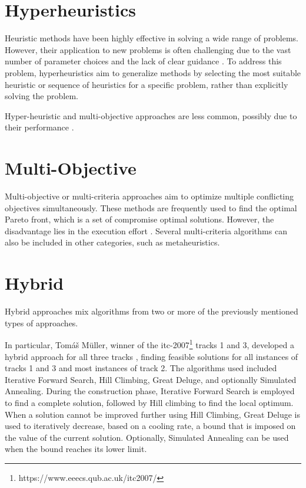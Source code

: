 
\section{Hyperheuristics}

Heuristic methods have been highly effective in solving a wide range of problems. However, their application to new problems is often challenging due to the vast number of parameter choices and the lack of clear guidance \cite{hyper_heuristics_survey}. To address this problem, hyperheuristics aim to generalize methods by selecting the most suitable heuristic or sequence of heuristics for a specific problem, rather than explicitly solving the problem.

Hyper-heuristic and multi-objective approaches are less common, possibly due to their performance \cite{chen_survey_2021}.

\section{Multi-Objective}

Multi-objective or multi-criteria approaches aim to optimize multiple conflicting objectives simultaneously. These methods are frequently used to find the optimal Pareto front, which is a set of compromise optimal solutions. However, the disadvantage lies in the execution effort \cite{chen_survey_2021}. Several multi-criteria algorithms can also be included in other categories, such as metaheuristics.

\section{Hybrid}

Hybrid approaches mix algorithms from two or more of the previously mentioned types of approaches.


In particular, Tomáš Müller, winner of the \ac{itc-2007}\footnote{https://www.eeecs.qub.ac.uk/itc2007/} tracks 1 and 3, developed a hybrid approach for all three tracks \cite{muller_itc2007}, finding feasible solutions for all instances of tracks 1 and 3 and most instances of track 2. The algorithms used included Iterative Forward Search, Hill Climbing, Great Deluge, and optionally Simulated Annealing. During the construction phase, Iterative Forward Search is employed to find a complete solution, followed by Hill climbing to find the local optimum. When a solution cannot be improved further using Hill Climbing, Great Deluge is used to iteratively decrease, based on a cooling rate, a bound that is imposed on the value of the current solution. Optionally, Simulated Annealing can be used when the bound reaches its lower limit.

